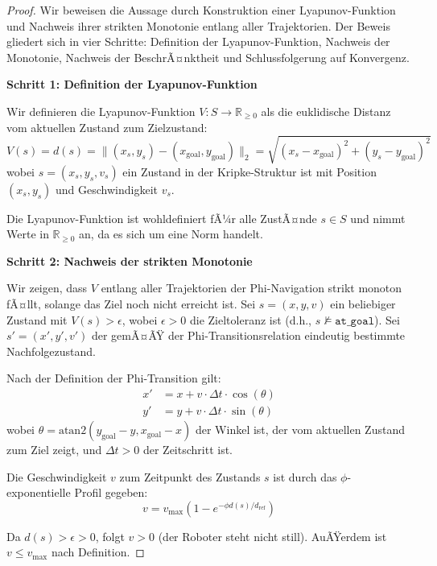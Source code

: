 ﻿\documentclass[a4paper,12pt]{article}
\theoremstyle{definition}
\begin{document}
\begin{proof}
Wir beweisen die Aussage durch Konstruktion einer Lyapunov-Funktion und Nachweis ihrer strikten Monotonie entlang aller Trajektorien. Der Beweis gliedert sich in vier Schritte: Definition der Lyapunov-Funktion, Nachweis der Monotonie, Nachweis der BeschrÃ¤nktheit und Schlussfolgerung auf Konvergenz.

\textbf{Schritt 1: Definition der Lyapunov-Funktion}

Wir definieren die Lyapunov-Funktion $V: S \to \mathbb{R}_{\geq 0}$ als die euklidische Distanz vom aktuellen Zustand zum Zielzustand:
\begin{equation}
V(s) = d(s) = \|(x_s, y_s) - (x_{\text{goal}}, y_{\text{goal}})\|_2 = \sqrt{(x_s - x_{\text{goal}})^2 + (y_s - y_{\text{goal}})^2}
\end{equation}
wobei $s = (x_s, y_s, v_s)$ ein Zustand in der Kripke-Struktur ist mit Position $(x_s, y_s)$ und Geschwindigkeit $v_s$.

Die Lyapunov-Funktion ist wohldefiniert fÃ¼r alle ZustÃ¤nde $s \in S$ und nimmt Werte in $\mathbb{R}_{\geq 0}$ an, da es sich um eine Norm handelt.

\textbf{Schritt 2: Nachweis der strikten Monotonie}

Wir zeigen, dass $V$ entlang aller Trajektorien der Phi-Navigation strikt monoton fÃ¤llt, solange das Ziel noch nicht erreicht ist. Sei $s = (x, y, v)$ ein beliebiger Zustand mit $V(s) > \epsilon$, wobei $\epsilon > 0$ die Zieltoleranz ist (d.h., $s \not\models \texttt{at\_goal}$). Sei $s' = (x', y', v')$ der gemÃ¤ÃŸ der Phi-Transitionsrelation eindeutig bestimmte Nachfolgezustand.

Nach der Definition der Phi-Transition gilt:
\begin{align}
x' &= x + v \cdot \Delta t \cdot \cos(\theta) \\
y' &= y + v \cdot \Delta t \cdot \sin(\theta)
\end{align}
wobei $\theta = \text{atan2}(y_{\text{goal}} - y, x_{\text{goal}} - x)$ der Winkel ist, der vom aktuellen Zustand zum Ziel zeigt, und $\Delta t > 0$ der Zeitschritt ist.

Die Geschwindigkeit $v$ zum Zeitpunkt des Zustands $s$ ist durch das $\phi$-exponentielle Profil gegeben:
\begin{equation}
v = v_{\max}(1 - e^{-\phi d(s)/d_{\text{ref}}})
\end{equation}

Da $d(s) > \epsilon > 0$, folgt $v > 0$ (der Roboter steht nicht still). AuÃŸerdem ist $v \leq v_{\max}$ nach Definition.


\end{proof}
\end{document}
